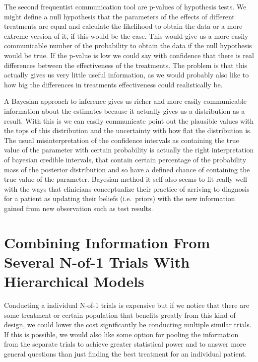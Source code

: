 \documentclass[12pt,a4paper,leqno]{report}
\theoremstyle{plain}
\theoremstyle{definition}
\theoremstyle{remark}
\begin{document}
The second frequentist communication tool are p-values of hypothesis tests. We might define
a null hypothesis that the parameters of the effects of different treatments are equal and
calculate the likelihood to obtain the data or a more extreme version of it, if this would be the case.
This would give us a more easily communicable number of the probability to obtain the data if the null
hypothesis would be true. If the p-value is low we could say with confidence that there is real differences
between the effectiveness of the treatments. The problem is that this actually gives us very little
useful information, as we would probably also like to how big the differences in treatments effectiveness
could realistically be.

A Bayesian approach to inference gives us richer and more easily communicable information about the estimates
because it actually gives us a distribution as a result. With this is we can easily communicate point out the plausible
values with the tops of this distribution and the uncertainty with how flat the distribution is.
The usual misinterpretation of the confidence intervals as containing the true value of the
parameter with certain probability is actually the right interpretation of bayesian credible intervals, that
contain certain percentage of the probability mass of the posterior distribution and so have a defined chance
of containing the true value of the parameter. Bayesian method it self also seems to fit really
well with the ways that clinicians conceptualize their practice of arriving to  diagnosis for a patient as
updating their beliefs (i.e.\ priors) with the new information gained from new observation such as
test results\cite{clinbayes}.

\chapter{Combining Information From Several N-of-1 Trials With Hierarchical
  Models}\label{hierarchicalbayes}

Conducting a individual N-of-1 trials is expensive but if we notice that there are
some treatment or certain population that benefits greatly from this kind of
design, we could lower the cost significantly be conducting multiple similar
trials. If this is possible, we would also like some option for pooling
the information from the separate trials to achieve greater statistical power
and to answer more general questions than just finding the best treatment
for an individual patient.
\end{document}
